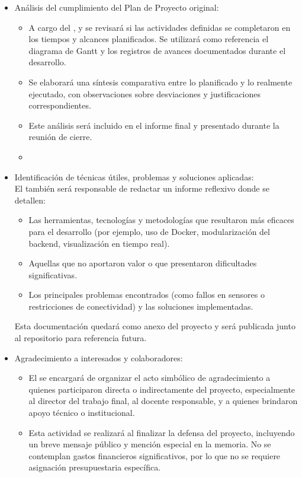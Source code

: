 \documentclass[
11pt, %
]{charter}
\begin{document}
\begin{itemize}
	\item Análisis del cumplimiento del Plan de Proyecto original: \\
	\begin{itemize}
		\item A cargo del {\authorname}, {\clientename} y {\supname} se revisará si las actividades definidas se completaron en los tiempos y alcances planificados. Se utilizará como referencia el diagrama de Gantt y los registros de avances documentados durante el desarrollo.
		\item Se elaborará una síntesis comparativa entre lo planificado y lo realmente ejecutado, con observaciones sobre desviaciones y justificaciones correspondientes.
		\item Este análisis será incluido en el informe final y presentado durante la reunión de cierre.
		\item 
    \end{itemize}		
	   

	\item Identificación de técnicas útiles, problemas y soluciones aplicadas:  \\
	El {\authorname} también será responsable de redactar un informe reflexivo donde se detallen:
	\begin{itemize}
	    \item Las herramientas, tecnologías y metodologías que resultaron más eficaces para el desarrollo (por ejemplo, uso de Docker, modularización del backend, visualización en tiempo real).
	    \item Aquellas que no aportaron valor o que presentaron dificultades significativas.
	    \item Los principales problemas encontrados (como fallos en sensores o restricciones de conectividad) y las soluciones implementadas. 
	\end{itemize}
	Esta documentación quedará como anexo del proyecto y será publicada junto al repositorio para referencia futura.

	\item Agradecimiento a interesados y colaboradores:  \\
	\begin{itemize}
	\item El {\authorname} se encargará de organizar el acto simbólico de agradecimiento a quienes participaron directa o indirectamente del proyecto, especialmente al director del trabajo final, al docente responsable, y a quienes brindaron apoyo técnico o institucional.  
	\item Esta actividad se realizará al finalizar la defensa del proyecto, incluyendo un breve mensaje público y mención especial en la memoria. No se contemplan gastos financieros significativos, por lo que no se requiere asignación presupuestaria específica.
    \end{itemize}		
	
\end{itemize}
\end{document}
